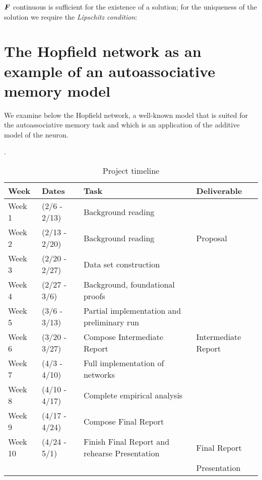 $\boldsymbol{F}$ continuous is sufficient for the existence of a solution; for the uniqueness of the solution we require the \emph{Lipschitz condition}:

\section{The Hopfield network as an example of an autoassociative memory model}

We examine below the Hopfield network, a well-known model that is suited for the autoassociative memory task and which is an application of the additive model of the neuron.

\cite{Yegnanarayana:2004:ANN:1197006}.

\begin{table*}[t]
  \caption{Project timeline}
  \label{tab:freq}
  \begin{tabular}{llll}
    \toprule
    Week & Dates & Task & Deliverable\\
    \midrule
    Week 1 & (2/6   - 2/13) & Background reading & \\
    Week 2 & (2/13  - 2/20) & Background reading & Proposal\\
    Week 3 & (2/20  - 2/27) & Data set construction & \\
    Week 4 & (2/27  - 3/6)  & Background, foundational proofs & \\
    Week 5 & (3/6   - 3/13) & Partial implementation and preliminary run & \\
    Week 6 & (3/20  - 3/27) & Compose Intermediate Report & Intermediate Report\\
    Week 7 & (4/3   - 4/10) & Full implementation of networks & \\
    Week 8 & (4/10  - 4/17) & Complete empirical analysis & \\
    Week 9 & (4/17  - 4/24) & Compose Final Report & \\
    Week 10 & (4/24 - 5/1) & Finish Final Report and rehearse Presentation & Final Report \\
    & & & Presentation\\
  \bottomrule
\end{tabular}
\end{table*}

